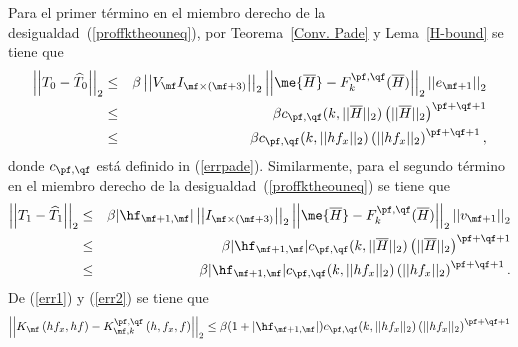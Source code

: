 Para el primer t\'ermino en el miembro derecho de la desigualdad~(\ref{proffktheouneq}), por Teorema~\ref{Conv. Pade} y Lema~\ref{H-bound} se tiene que
\begin{eqnarray}
\left\lvert\left\lvert T_0 - \widehat{T}_0\right\rvert\right\rvert_2  
&\leq& \beta \left\lvert\left\lvert  V_{\mf}I_{\mf\times (\mf+3)} \right\rvert\right\rvert_2 \left\lvert\left\lvert \me{\overline{H}}-F_k^{\pf,\qf}(\overline{H}) \right\rvert\right\rvert_2
\left\lvert\left\lvert  e_{\mf+1} \right\rvert\right\rvert_2 \nonumber\\
&\leq& \beta c_{\pf,\qf}(k,\lvert\lvert\overline{H}\rvert\rvert_2)
 \left(\lvert\lvert\overline{H}\rvert\rvert_2\right)^{\pf+\qf+1}\nonumber\\
&\leq& \beta c_{\pf,\qf}(k,\lvert\lvert hf_x \rvert\rvert_2) 
\left(\lvert\lvert hf_x \rvert\rvert_2\right)^{\pf+\qf+1}\label{err1},
\end{eqnarray}
donde $c_{\pf,\qf}$ est\'a definido in (\ref{errpade}).
Similarmente, para el segundo t\'ermino en el miembro derecho de la desigualdad~(\ref{proffktheouneq}) se tiene que 
\begin{eqnarray}
\left\lvert\left\lvert T_1 - \widehat{T}_1 \right\rvert\right\rvert_2 
&\leq& \beta \lvert \hf_{\mf+1,\mf}\rvert \left\lvert\left\lvert I_{\mf\times (\mf+3)}\right\rvert\right\rvert_2 \left\lvert\left\lvert \me{\overline{H}}-
F_k^{\pf,\qf}(\overline{H}) \right\rvert\right\rvert_2\left\lvert\left\lvert v_{\mf+1}\right\rvert\right\rvert_2 \nonumber\\
&\leq&\beta \lvert \hf_{\mf+1,\mf}\rvert c_{\pf,\qf}
(k,\lvert\lvert\overline{H}\rvert\rvert_2) 
\left(\lvert\lvert\overline{H}\rvert\rvert_2\right)^{\pf+\qf+1}\nonumber\\
&\leq&\beta \lvert \hf_{\mf+1,\mf}\rvert c_{\pf,\qf}(k,\lvert\lvert hf_x \rvert\rvert_2) 
\left(\lvert\lvert hf_x \rvert\rvert_2\right)^{\pf+\qf+1}\label{err2}.
\end{eqnarray}
De (\ref{err1}) y (\ref{err2}) se tiene que
\begin{equation}
\left\lvert\left\lvert  K_{\mf}\left( hf_x , hf \right) -  
K_{\mf,k}^{\pf,\qf}\left( h,  f_x , f \right)\right\rvert\right\rvert_2
\leq \beta(1+\lvert\hf_{\mf+1,\mf}\rvert)c_{\pf,\qf}(k,\lvert\lvert hf_x \rvert\rvert_2) 
\left(\lvert\lvert hf_x \rvert\rvert_2\right)^{\pf+\qf+1}\label{errp1}
\end{equation}
